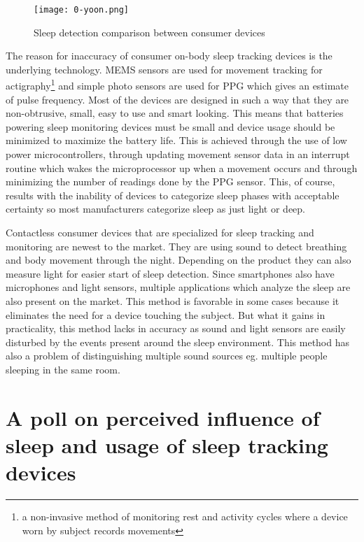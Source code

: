 \begin{figure}[h]
  \begin{center}
    \texttt{[image: 0-yoon.png]}
  \end{center}
  \caption{Sleep detection comparison between consumer devices}
  \label{fig:yoon}
\end{figure}

The reason for inaccuracy of consumer on-body sleep tracking devices is the underlying technology. \ac{MEMS} sensors are used for movement tracking for actigraphy\footnote{a non-invasive method of monitoring rest and activity cycles where a device worn by subject records movements} and simple photo sensors are used for \ac{PPG} which gives an estimate of pulse frequency. Most of the devices are designed in such a way that they are non-obtrusive, small, easy to use and smart looking. This means that batteries powering sleep monitoring devices must be small and device usage should be minimized to maximize the battery life. This is achieved through the use of low power microcontrollers, through updating movement sensor data in an interrupt routine which wakes the microprocessor up when a movement occurs and through minimizing the number of readings done by the \ac{PPG} sensor. This, of course, results with the inability of devices to categorize sleep phases with acceptable certainty so most manufacturers categorize sleep as just light or deep.

Contactless consumer devices that are specialized for sleep tracking and monitoring are newest to the market. They are using sound to detect breathing and body movement through the night. Depending on the product they can also measure light for easier start of sleep detection. Since smartphones also have microphones and light sensors, multiple applications which analyze the sleep are also present on the market. This method is favorable in some cases because it eliminates the need for a device touching the subject. But what it gains in practicality, this method lacks in accuracy as sound and light sensors are easily disturbed by the events present around the sleep environment. This method has also a problem of distinguishing multiple sound sources eg. multiple people sleeping in the same room.


\section{A poll on perceived influence of sleep and usage of sleep tracking devices}


